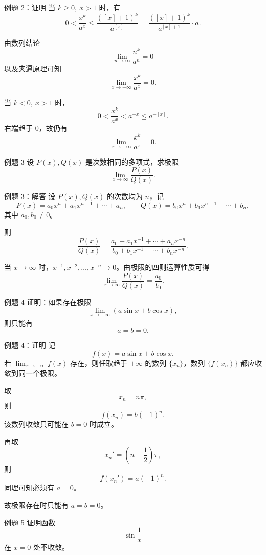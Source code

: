 ﻿\documentclass[aspectratio=169,11pt]{ctexbeamer}
\begin{document}
\begin{frame}[allowframebreaks]{例题 2：证明}
当 $k\ge 0,\ x>1$ 时，有
\[
  0<\frac{x^k}{a^x}
  \le
  \frac{([x]+1)^k}{a^{[x]}}
  =
  \frac{([x]+1)^k}{a^{[x]+1}}\cdot a.
\]

由数列结论
\[
  \lim_{n\to\infty}\frac{n^k}{a^n}=0
\]
以及夹逼原理可知
\[
  \lim_{x\to+\infty}\frac{x^k}{a^x}=0.
\]

当 $k<0,\ x>1$ 时，
\[
  0<\frac{x^k}{a^x}<a^{-x}\le a^{-[x]}.
\]
右端趋于 $0$，故仍有
\[
  \lim_{x\to+\infty}\frac{x^k}{a^x}=0.
\]
\end{frame}

\begin{frame}{例题 3}
设 $P(x),Q(x)$ 是次数相同的多项式，求极限
\[
  \lim_{x\to\infty}\frac{P(x)}{Q(x)}.
\]
\end{frame}

\begin{frame}{例题 3：解答}
设 $P(x),Q(x)$ 的次数均为 $n$，记
\[
  P(x)=a_0x^n+a_1x^{n-1}+\cdots+a_n,\qquad
  Q(x)=b_0x^n+b_1x^{n-1}+\cdots+b_n,
\]
其中 $a_0,b_0\ne 0$。

则
\[
  \frac{P(x)}{Q(x)}
  =
  \frac{a_0+a_1x^{-1}+\cdots+a_nx^{-n}}
       {b_0+b_1x^{-1}+\cdots+b_nx^{-n}}.
\]

当 $x\to\infty$ 时，$x^{-1},x^{-2},\dots,x^{-n}\to 0$。由极限的四则运算性质可得
\[
  \lim_{x\to\infty}\frac{P(x)}{Q(x)}=\frac{a_0}{b_0}.
\]
\end{frame}

\begin{frame}{例题 4}
证明：如果存在极限
\[
  \lim_{x\to+\infty}(a\sin x+b\cos x),
\]
则只能有
\[
  a=b=0.
\]
\end{frame}

\begin{frame}[allowframebreaks]{例题 4：证明}
记
\[
  f(x)=a\sin x+b\cos x.
\]
若 $\lim_{x\to+\infty}f(x)$ 存在，则任取趋于 $+\infty$ 的数列 $\{x_n\}$，数列 $\{f(x_n)\}$ 都应收敛到同一个极限。

\vspace{0.5em}
取
\[
  x_n=n\pi,
\]
则
\[
  f(x_n)=b(-1)^n.
\]
该数列收敛只可能在 $b=0$ 时成立。

\vspace{0.5em}
再取
\[
  x_n'=\left(n+\frac12\right)\pi,
\]
则
\[
  f(x_n')=a(-1)^n.
\]
同理可知必须有 $a=0$。

\vspace{0.5em}
故极限存在时只能有 $a=b=0$。
\end{frame}

\begin{frame}{例题 5}
证明函数
\[
  \sin\frac1x
\]
在 $x=0$ 处不收敛。
\end{frame}
\end{document}
